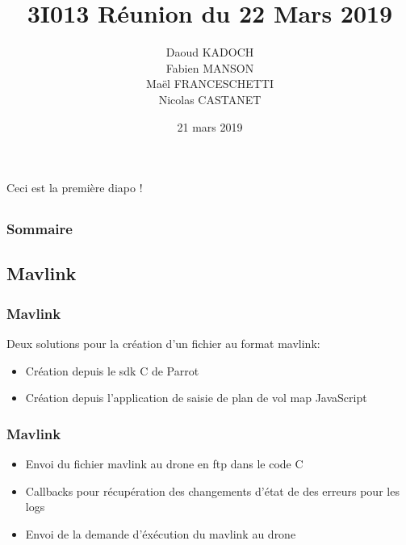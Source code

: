 \documentclass{beamer}
\title{3I013 Réunion du 22 Mars 2019}
\author{Daoud KADOCH\\Fabien MANSON\\Maël FRANCESCHETTI\\Nicolas CASTANET\\}
\begin{document}
	\begin{frame}
		\begin{center}
		\date{21 mars 2019}
		\maketitle
		Ceci est la première diapo !\\
		\end{center}
	\end{frame}
	
	
	
	\begin{frame}
		\section{}
		\begin{flushleft}
		\frametitle{Sommaire}
		\tableofcontents{}
		\end{flushleft}
	\end{frame}
	
	
	\begin{frame}
	\section{Mavlink}
		\begin{center}
		\frametitle{Mavlink}
        Deux solutions pour la création d'un fichier au format mavlink:
        
           	\begin{itemize}
                \item Création depuis le sdk C de Parrot
                \item Création depuis l'application de saisie de plan de vol map JavaScript
            \end{itemize}
		\end{center}
	\end{frame}
	
	\begin{frame}
		\begin{center}
		\frametitle{Mavlink}
           	\begin{itemize}
                \item Envoi du fichier mavlink au drone en ftp dans le code C
                \item Callbacks pour récupération des changements d'état de des erreurs pour les logs
                \item Envoi de la demande d'éxécution du mavlink au drone
            \end{itemize}
		\end{center}
	\end{frame}
	
\end{document}
